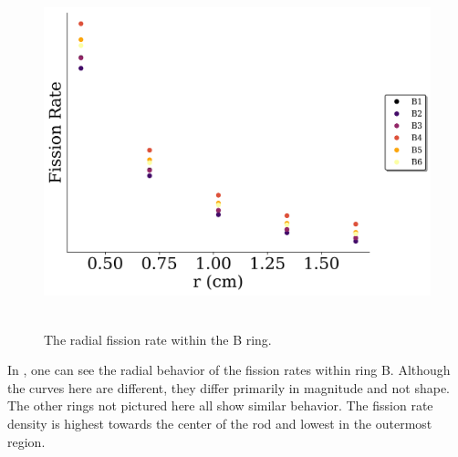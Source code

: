 \begin{figure}[htb]
\centering
\includegraphics[height=4in]{tex/figures/radial_rr_density_B.png}
\caption[Radial Fission Rate Density B]{The radial fission rate within the B ring.}
\label{fig:radial_rr_density_B}
\end{figure}

In , one can see the radial behavior of the fission rates within ring B.
Although the curves here are different, they differ primarily in magnitude and not shape.
The other rings not pictured here all show similar behavior.
The fission rate density is highest towards the center of the rod and lowest in the outermost region.

